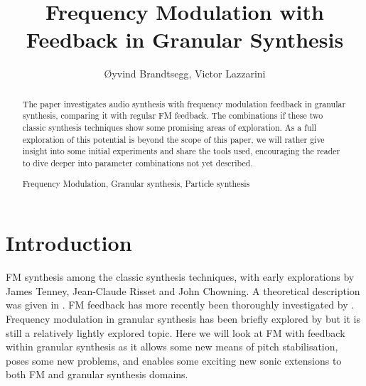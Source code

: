 \documentclass[runningheads,a4paper]{llncs}
\newcommand{\keywords}[1]{\par\addvspace\baselineskip
\noindent\keywordname\enspace\ignorespaces#1}
\begin{document}
\mainmatter  %

\title{Frequency Modulation with Feedback in Granular Synthesis}




\author{Øyvind Brandtsegg, Victor Lazzarini}
%




\maketitle

\begin{abstract}

The paper investigates audio synthesis with frequency modulation feedback in granular synthesis, comparing it with regular FM feedback. The combinations if these two classic synthesis techniques show some promising areas of exploration. As a full exploration of this potential is beyond the scope of this paper, we will rather give insight into some initial experiments and share the tools used, encouraging the reader to dive deeper into parameter combinations not yet described.

\keywords{Frequency Modulation, Granular synthesis, Particle synthesis}
\end{abstract}


\section{Introduction}
FM synthesis among the classic synthesis techniques, with early explorations by James Tenney, Jean-Claude Risset and John Chowning. A theoretical description was given in \cite{Chowning-73}. FM feedback has more recently been thoroughly investigated by \cite{Lazzarini-2024}. Frequency modulation in granular synthesis has been briefly explored by \cite{Ervik-Brandtsegg} but it is still a relatively lightly explored topic. Here we will look at FM with feedback within granular synthesis as it allows some new means of pitch stabilisation, poses some new problems, and enables some exciting new sonic extensions to both FM and granular synthesis domains.
\end{document}
